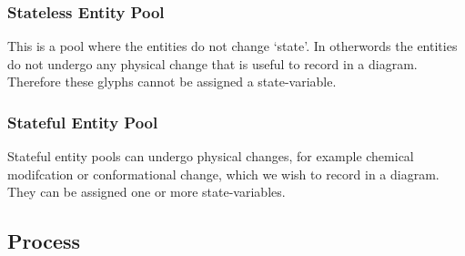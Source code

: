  
\subsubsection{Stateless Entity Pool}

This is a pool where the entities do not change `state'. In otherwords
the entities do not undergo any physical change that is useful to
record in a \PD diagram. Therefore these glyphs cannot be assigned a state-variable.






\subsubsection{Stateful Entity Pool}

Stateful entity pools can undergo physical changes, for example chemical
modifcation or conformational change, which we wish to record in a \PD
diagram. They can be assigned one or more state-variables.




%
%





\subsection{Process}\label{sec:PNs}

